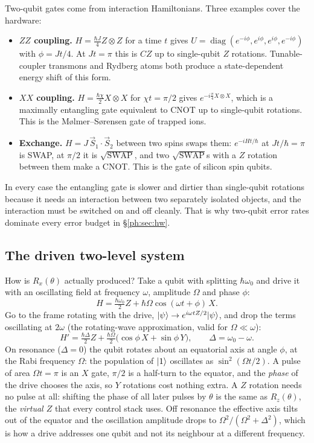 Two-qubit gates come from interaction Hamiltonians. Three examples cover the hardware:
\begin{itemize}\setlength\itemsep{2pt}
\item \textbf{$ZZ$ coupling.} $H=\tfrac{\hbar J}{4}Z\otimes Z$ for a time $t$ gives
  $U=\operatorname{diag}(e^{-i\phi},e^{i\phi},e^{i\phi},e^{-i\phi})$ with $\phi=Jt/4$. At
  $Jt=\pi$ this is $CZ$ up to single-qubit $Z$ rotations. Tunable-coupler transmons and
  Rydberg atoms both produce a state-dependent energy shift of this form.
\item \textbf{$XX$ coupling.} $H=\tfrac{\hbar\chi}{2}X\otimes X$ for $\chi t=\pi/2$ gives
  $e^{-i\frac\pi4X\otimes X}$, which is a maximally entangling gate equivalent to CNOT up to
  single-qubit rotations. This is the M\o lmer--S\o rensen gate of trapped ions.
\item \textbf{Exchange.} $H=J\,\vec S_1\cdot\vec S_2$ between two spins swaps them:
  $e^{-iHt/\hbar}$ at $Jt/\hbar=\pi$ is SWAP, at $\pi/2$ it is $\sqrt{\mathrm{SWAP}}$, and two
  $\sqrt{\mathrm{SWAP}}$s with a $Z$ rotation between them make a CNOT. This is the gate of
  silicon spin qubits.
\end{itemize}
In every case the entangling gate is slower and dirtier than single-qubit rotations because it
needs an interaction between two separately isolated objects, and the interaction must be
switched on and off cleanly. That is why two-qubit error rates dominate every error budget in
\S\ref{ph:sec:hw}.

\subsection{The driven two-level system}\label{ph:sec:rabi}

How is $R_x(\theta)$ actually produced? Take a qubit with splitting $\hbar\omega_0$ and drive it
with an oscillating field at frequency $\omega$, amplitude $\Omega$ and phase $\phi$:
\[ H=\tfrac{\hbar\omega_0}{2}Z+\hbar\Omega\cos(\omega t+\phi)\,X . \]
Go to the frame rotating with the drive, $\lvert \psi \rangle\to e^{i\omega tZ/2}\lvert \psi \rangle$, and drop the terms
oscillating at $2\omega$ (the rotating-wave approximation, valid for $\Omega\ll\omega$):
\[ H'=\tfrac{\hbar\Delta}{2}Z+\tfrac{\hbar\Omega}{2}\big(\cos\phi\,X+\sin\phi\,Y\big),
   \qquad \Delta=\omega_0-\omega . \]
On resonance ($\Delta=0$) the qubit rotates about an equatorial axis at angle $\phi$, at the Rabi
frequency $\Omega$: the population of $\lvert 1 \rangle$ oscillates as $\sin^2(\Omega t/2)$. A pulse of area
$\Omega t=\pi$ is an $X$ gate, $\pi/2$ is a half-turn to the equator, and the \emph{phase} of
the drive chooses the axis, so $Y$ rotations cost nothing extra. A $Z$ rotation needs no pulse
at all: shifting the phase of all later pulses by $\theta$ is the same as $R_z(\theta)$, the
\emph{virtual $Z$} that every control stack uses. Off resonance the effective axis tilts out of
the equator and the oscillation amplitude drops to $\Omega^2/(\Omega^2+\Delta^2)$, which is how a
drive addresses one qubit and not its neighbour at a different frequency.

